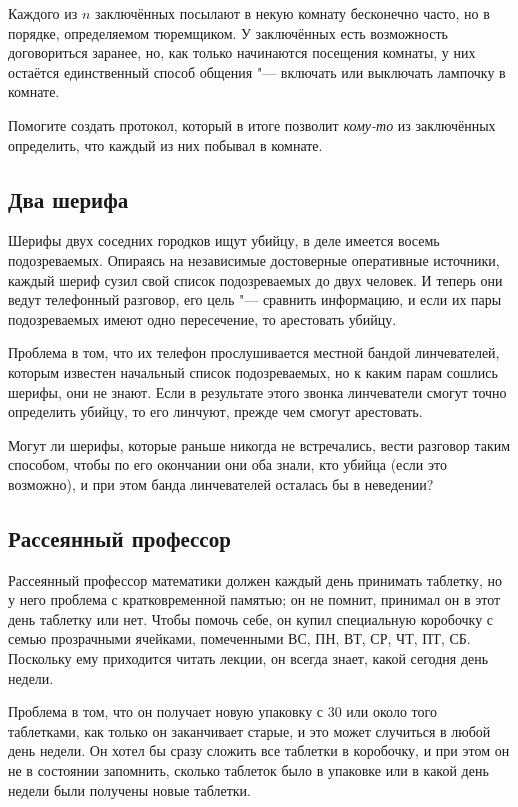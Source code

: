 \documentclass[twoside]{book}
\makeatletter
\newcommand{\rindex}[2][\imki@jobname]{%
  \index[#1]{\detokenize{#2}}%
}
\makeatother
\begin{document}
Каждого из $n$ заключённых посылают в некую комнату бесконечно часто, но в порядке, определяемом тюремщиком.
У заключённых есть возможность договориться заранее, но, как только начинаются посещения комнаты, у них остаётся единственный способ общения "--- включать или выключать лампочку в комнате.

Помогите создать протокол, который в итоге позволит \emph{кому-то} из заключённых определить, что каждый из них побывал в комнате.

\subsection*{Два шерифа}%
\rindex{Два шерифа}

Шерифы двух соседних городков ищут убийцу, в деле имеется восемь подозреваемых.
Опираясь на независимые достоверные оперативные источники, каждый шериф сузил свой список подозреваемых до двух человек.
И теперь они ведут телефонный разговор, его цель "--- сравнить информацию, и если их пары подозреваемых имеют одно пересечение, то арестовать убийцу.

Проблема в том, что их телефон прослушивается местной бандой линчевателей, которым известен начальный список подозреваемых, но к каким парам сошлись шерифы, они не знают.
Если в результате этого звонка линчеватели смогут точно определить убийцу, то его линчуют, прежде чем смогут арестовать.

Могут ли шерифы, которые раньше никогда не встречались, вести разговор таким способом, чтобы по его окончании они оба знали, кто убийца (если это возможно), и при этом банда линчевателей осталась бы в неведении?

\subsection*{Рассеянный профессор}%
\rindex{Рассеянный профессор}

Рассеянный профессор математики должен каждый день принимать таблетку, но у него проблема с кратковременной памятью; он не помнит, принимал он в этот день таблетку или нет.
Чтобы помочь себе, он купил специальную коробочку с семью прозрачными ячейками, помеченными ВС, ПН, ВТ, СР, ЧТ, ПТ, СБ.
Поскольку ему приходится читать лекции, он всегда знает, какой сегодня день недели.

Проблема в том, что он получает новую упаковку с 30 или около того таблетками, как только он заканчивает старые, и это может случиться в любой день недели.
Он хотел бы сразу сложить все таблетки в коробочку, и при этом он не в состоянии запомнить, сколько таблеток было в упаковке или в какой день недели были получены новые таблетки.
\end{document}
